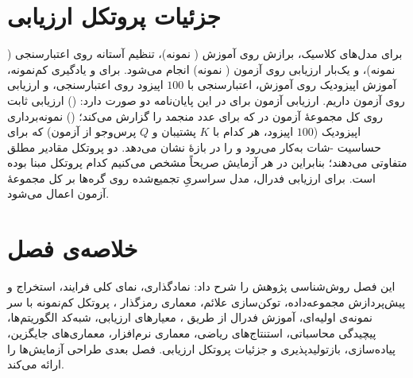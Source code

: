 \section{جزئیات پروتکل ارزیابی}

برای مدل‌های کلاسیک، برازش روی آموزش ( نمونه)، تنظیم آستانه روی اعتبارسنجی ( نمونه)، و یک‌بار ارزیابی روی آزمون ( نمونه) انجام می‌شود. برای  و یادگیری کم‌نمونه، آموزش اپیزودیک روی آموزش، اعتبارسنجی با $100$ اپیزود روی اعتبارسنجی، و ارزیابی روی آزمون داریم. ارزیابی آزمون برای  در این پایان‌نامه دو صورت دارد: () ارزیابی ثابت روی کل مجموعۀ آزمون در  که برای \texttt{} عدد منجمد  را گزارش می‌کند؛ () نمونه‌برداری اپیزودیک ($100$ اپیزود، هر کدام با $K$ پشتیبان و $Q$ پرس‌وجو از آزمون) که برای حساسیت -شات به‌کار می‌رود و  را در بازۀ  نشان می‌دهد. دو پروتکل مقادیر مطلق متفاوتی می‌دهند؛ بنابراین در هر آزمایش صریحاً مشخص می‌کنیم کدام پروتکل مبنا بوده است. برای ارزیابی فدرال، مدل سراسریِ تجمیع‌شده روی گره‌ها بر کل مجموعۀ آزمون اعمال می‌شود.

\section{خلاصه‌ی فصل}

این فصل روش‌شناسی پژوهش را شرح داد: نمادگذاری، نمای کلی فرایند، استخراج و پیش‌پردازش مجموعه‌داده، توکن‌سازی علائم، معماری رمزگذار ، پروتکل کم‌نمونه با سر نمونه‌ی اولیه‌ای، آموزش فدرال از طریق ، معیارهای ارزیابی، شبه‌کد الگوریتم‌ها، پیچیدگی محاسباتی، استنتاج‌های ریاضی، معماری نرم‌افزار، معماری‌های جایگزین، پیاده‌سازی، بازتولیدپذیری و جزئیات پروتکل ارزیابی. فصل بعدی طراحی آزمایش‌ها را ارائه می‌کند.
